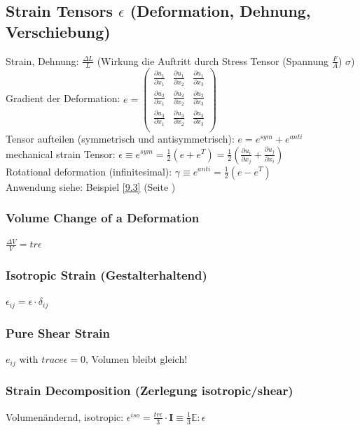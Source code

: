 \documentclass[a4paper]{scrartcl}
\begin{document}
\subsection{Strain Tensors $\epsilon$ (Deformation, Dehnung, Verschiebung)}
Strain, Dehnung: $\frac{\Delta L}{L}$ (Wirkung die Auftritt durch Stress
Tensor (Spannung $\frac{F}{A}$) $\sigma$)\\
Gradient der Deformation: $e = \begin{pmatrix}
\frac{\partial u_1}{\partial x_1} & \frac{\partial u_1}{\partial x_2} &
\frac{\partial u_1}{\partial x_3}\\
\frac{\partial u_2}{\partial x_1} & \frac{\partial u_2}{\partial x_2} &
\frac{\partial u_2}{\partial x_3}\\
\frac{\partial u_3}{\partial x_1} & \frac{\partial u_3}{\partial x_2} &
\frac{\partial u_3}{\partial x_3}\\
\end{pmatrix}$\\
Tensor aufteilen (symmetrisch und antisymmetrisch): $e = e^{sym} + e^{anti}$\\
mechanical strain Tensor: $\epsilon \equiv e^{sym} = \frac{1}{2} (e + e^T) =
\frac{1}{2} (\frac{\partial u_i}{\partial x_j} + \frac{\partial
u_j}{\partial x_i})$\\
Rotational deformation (infinitesimal): $\gamma \equiv e^{anti} = \frac{1}{2} (e
- e^T)$\\
Anwendung siehe: Beispiel \ref{9.3} (Seite \pageref{9.3})

\subsubsection{Volume Change of a Deformation}
$\frac{\Delta V}{V} = tr \epsilon $

\subsubsection{Isotropic Strain (Gestalterhaltend)}
$\epsilon_{ij} = \epsilon \cdot \delta_{ij} $

\subsubsection{Pure Shear Strain}
$e_{ij}$ with $trace \epsilon = 0$, Volumen bleibt gleich!

\subsubsection{Strain Decomposition (Zerlegung isotropic/shear)}
\label{straindecomposition}
Volumenändernd, isotropic: $\epsilon^{iso} = \frac{tr \epsilon}{3} \cdot \mathbf{I}
\equiv \frac{1}{3} \mathbb{E} : \epsilon$\\
\end{document}

